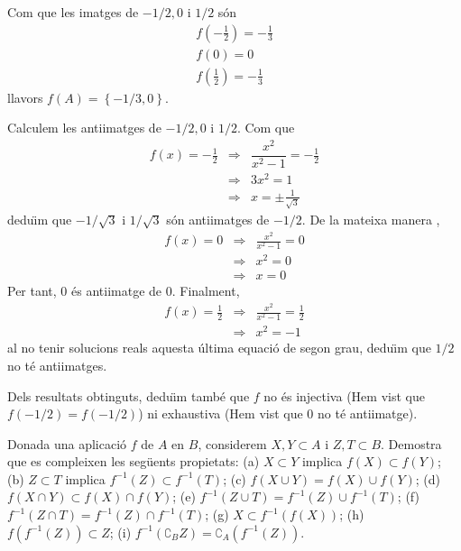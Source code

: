 \begin{solucio}
Com que les imatges de $-1/2,0$ i $1/2$ s\'{o}n%
\begin{equation*}
\begin{array}{l}
f(-\frac{1}{2})=-\frac{1}{3} \\
f(0)=0 \\
f(\frac{1}{2})=-\frac{1}{3}%
\end{array}%
\end{equation*}%
llavors $f(A)=\left\{ -1/3,0\right\} $.

Calculem les antiimatges de $-1/2,0$ i $1/2$. Com que%
\begin{equation*}
\begin{array}{lll}
f(x)=-\frac{1}{2} & \Longrightarrow & \dfrac{x^{2}}{x^{2}-1}=-\frac{1}{2} \\
& \Longrightarrow & 3x^{2}=1 \\
& \Longrightarrow & x=\pm \frac{1}{\sqrt{3}}%
\end{array}%
\end{equation*}%
dedu\"{\i}m que $-1/\sqrt{3}$ i $1/\sqrt{3}$ s\'{o}n antiimatges de $-1/2$.
De la mateixa manera ,%
\begin{equation*}
\begin{array}{lll}
f(x)=0 & \Longrightarrow & \frac{x^{2}}{x^{2}-1}=0 \\
& \Longrightarrow & x^{2}=0 \\
& \Longrightarrow & x=0%
\end{array}%
\end{equation*}%
Per tant, $0$ \'{e}s antiimatge de $0$. Finalment,%
\begin{equation*}
\begin{array}{lll}
f(x)=\frac{1}{2} & \Longrightarrow & \frac{x^{2}}{x^{2}-1}=\frac{1}{2} \\
& \Longrightarrow & x^{2}=-1%
\end{array}%
\end{equation*}%
al no tenir solucions reals aquesta \'{u}ltima equaci\'{o} de segon grau,
dedu\"{\i}m que $1/2$ no t\'{e} antiimatges.

Dels resultats obtinguts, dedu\"{\i}m tamb\'{e} que $f$ no \'{e}s injectiva
(Hem vist que $f(-1/2)=f(-1/2)$) ni exhaustiva (Hem vist que $0$ no t\'{e}
antiimatge).
\end{solucio}

\begin{exercici}
Donada una aplicaci\'{o} $f$ de $A$ en $B$, considerem $X,Y\subset A$ i $%
Z,T\subset B$. Demostra que es compleixen les seg\"{u}ents propietats: (a) $%
X\subset Y$ implica $f(X)\subset f(Y)$; (b) $Z\subset T$ implica $%
f^{-1}(Z)\subset f^{-1}(T)$; (c) $f(X\cup Y)=f(X)\cup f(Y)$; (d) $f(X\cap
Y)\subset f(X)\cap f(Y)$; (e) $f^{-1}(Z\cup T)=f^{-1}(Z)\cup f^{-1}(T)$; (f)
$f^{-1}(Z\cap T)=f^{-1}(Z)\cap f^{-1}(T)$; (g) $X\subset f^{-1}\left(
f(X)\right) $; (h) $f\left( f^{-1}(Z)\right) \subset Z$; (i) $f^{-1}\left(
\complement _{B}Z\right) =\complement _{A}\left( f^{-1}(Z)\right) $.
\end{exercici}

